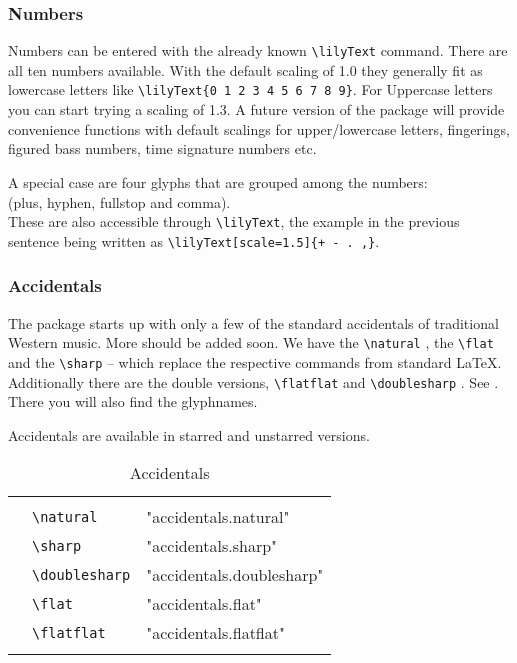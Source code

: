 \documentclass{article}
\newcommand*{\cmd}[1]{\texttt{\textbackslash #1}}
\newenvironment{reftable}[2]
	{%
		\begin{table}[ht]
			\begin{center}
				\caption{#1}
				\label{tab:#2}
				\begin{tabular}[t]{lll}
					\hline
					&\\
	}
	{%
					&\\
					\hline
				\end{tabular}
			\end{center}
		\end{table}
	}
\begin{document}
\subsubsection{Numbers}
\label{subsubsec:numbers}
Numbers can be entered with the already known \cmd{lilyText} command. 
There are all ten numbers available. 
With the default scaling of 1.0 they generally fit as lowercase letters like  \cmd{lilyText\{0 1 2 3 4 5 6 7 8 9\}}. 
For Uppercase letters you can start trying a scaling of 1.3. A future version of the package will provide convenience functions with default scalings for upper/lowercase letters, fingerings, figured bass numbers, time signature numbers etc.

A special case are four glyphs that are grouped among the numbers:\\
 (plus, hyphen, fullstop and comma). \\
These are also accessible through \cmd{lilyText}, the example in the previous sentence being written as \cmd{lilyText[scale=1.5]\{+~-~.~,\}}.

\subsubsection{Accidentals}
\label{subsubsec:numbers}
The package starts up with only a few of the standard accidentals of traditional Western music. 
More should be added soon. 
We have the \cmd{natural} \natural*, the \cmd{flat} \flat and the \cmd{sharp} \sharp -- which replace the respective commands from standard \LaTeX. 
Additionally there are the double versions, \cmd{flatflat} \flatflat and \cmd{doublesharp} \doublesharp*. See . 
There you will also find the glyphnames.

Accidentals are available in starred and unstarred versions.

\begin{reftable}{Accidentals}{accidentals}
\natural & \cmd{natural} & "accidentals.natural"\\
\sharp & \cmd{sharp} & "accidentals.sharp"\\
\doublesharp & \cmd{doublesharp} & "accidentals.doublesharp"\\
\flat & \cmd{flat} & "accidentals.flat"\\
\flatflat & \cmd{flatflat} & "accidentals.flatflat"\\
\end{reftable}
\end{document}
